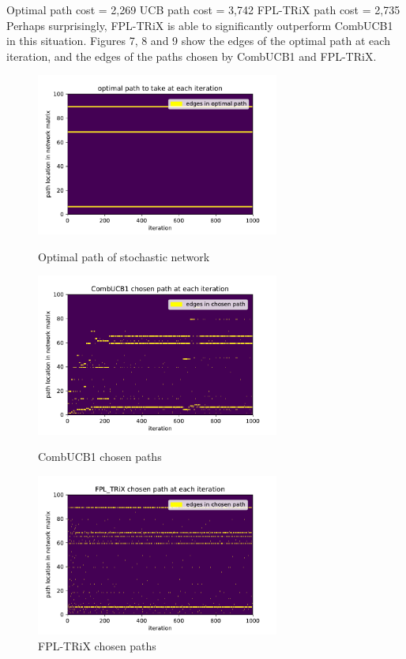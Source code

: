 Optimal path cost = 2,269
UCB path cost = 3,742
FPL-TRiX path cost = 2,735\\

Perhaps surprisingly, FPL-TRiX is able to significantly outperform CombUCB1 in this situation. Figures 7, 8 and 9 show the edges of the optimal path at each iteration, and the edges of the paths chosen by CombUCB1 and FPL-TRiX.\\

\begin{figure}%
  \centering
  \includegraphics[width=8cm]{../plots/stoch_network_opt_paths.pdf}
  \caption{Optimal path of stochastic network}
  \label{}
  \includegraphics[width=8cm]{../plots/stoch_network_UCB1.pdf}
  \caption{CombUCB1 chosen paths}
  \label{}
  \includegraphics[width=8cm]{../plots/stoch_network_FPL.pdf}
  \caption{FPL-TRiX chosen paths}
  \label{}
\end{figure}





